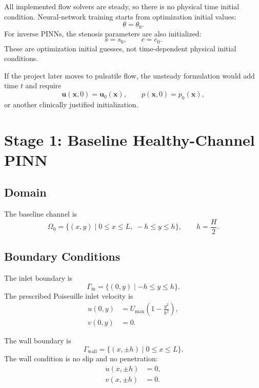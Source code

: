 \documentclass[11pt]{article}
\begin{document}
All implemented flow solvers are steady, so there is no physical time initial condition. Neural-network training starts from optimization initial values:
\begin{equation}
    \theta = \theta_0.
\end{equation}
For inverse PINNs, the stenosis parameters are also initialized:
\begin{equation}
    s=s_0,
    \qquad
    c=c_0.
\end{equation}
These are optimization initial guesses, not time-dependent physical initial conditions.

If the project later moves to pulsatile flow, the unsteady formulation would add time $t$ and require
\begin{equation}
    \bm{u}(\bm{x},0)=\bm{u}_0(\bm{x}),
    \qquad
    p(\bm{x},0)=p_0(\bm{x}),
\end{equation}
or another clinically justified initialization.

\section{Stage 1: Baseline Healthy-Channel PINN}

\subsection{Domain}

The baseline channel is
\begin{equation}
    \Omega_0
    =
    \{(x,y)\mid 0\le x\le L,\; -h\le y\le h\},
    \qquad
    h=\frac{H}{2}.
\end{equation}

\subsection{Boundary Conditions}

The inlet boundary is
\begin{equation}
    \Gamma_{\mathrm{in}}
    =
    \{(0,y)\mid -h\le y\le h\}.
\end{equation}
The prescribed Poiseuille inlet velocity is
\begin{align}
    u(0,y)
    &=
    U_{\max}
    \left(
        1-\frac{y^2}{h^2}
    \right),\\
    v(0,y) &= 0.
\end{align}

The wall boundary is
\begin{equation}
    \Gamma_{\mathrm{wall}}
    =
    \{(x,\pm h)\mid 0\le x\le L\}.
\end{equation}
The wall condition is no slip and no penetration:
\begin{align}
    u(x,\pm h)&=0,\\
    v(x,\pm h)&=0.
\end{align}
\end{document}
